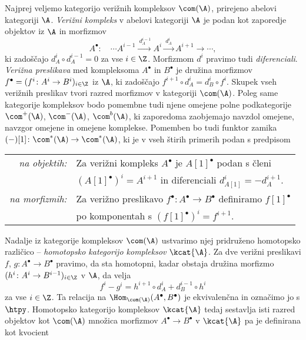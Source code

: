Najprej veljemo kategorijo verižnih kompleksov $\com(\A)$, prirejeno abelovi kategoriji $\A$. \emph{Verižni kompleks} v abelovi kategoriji $\A$ je podan kot zaporedje objektov iz $\A$ in morfizmov
\[
    A^\bullet : \quad \cdots A^{i-1} \xrightarrow{\ d_A^{i-1}} A^i \xrightarrow{\ d_A^{i} \ } A^{i+1} \to \cdots,
\] 
ki zadoščajo $d_A^{i} \circ d_A^{i-1} = 0$ za vse $i \in \Z$. Morfizmom $d^i$ pravimo tudi \emph{diferenciali}. \emph{Verižna preslikava} med kompleksoma $A^\bullet$ in $B^\bullet$ je družina morfizmov $f^\bullet = (f^i \colon A^i \to B^i)_{i \in \Z}$ iz $\A$, ki zadoščajo $f^{i+1} \circ d^i_A = d^i_B \circ f^i$. Skupek vseh verižnih preslikav tvori razred morfizmov v kategoriji $\com(\A)$. Poleg same kategorije kompleksov bodo pomembne tudi njene omejene polne podkategorije $\com^+(\A)$, $\com^-(\A)$, $\com^b(\A)$, ki zaporedoma zaobjemajo navzdol omejene, navzgor omejene in omejene komplekse. Pomemben bo tudi funktor zamika $(-)[1] \colon \com^*(\A) \to \com^*(\A)$, ki je v vseh štirih primerih podan s predpisom 
\begin{center}
    \begin{tabular}{r l}
        \textsl{na objektih:} & Za verižni kompleks $A^\bullet$ je $A[1]^\bullet$ podan s členi \\ & $(A[1]^\bullet)^i = A^{i+1}$ in diferenciali $d^i_{A[1]} = - d^{i+1}_{A}$. \\
        \textsl{na morfizmih:} & Za verižno preslikavo $f^\bullet\colon A^\bullet \to B^\bullet$ definiramo $f[1]^\bullet$ \\ & po komponentah s $(f[1]^\bullet)^i = f^{i+1}$.
    \end{tabular}
\end{center}
Nadalje iz kategorije kompleksov $\com(\A)$ ustvarimo njej pridruženo homotopsko različico -- \emph{homotopsko kategorijo kompleksov} $\kcat{\A}$. Za dve verižni preslikavi $f$, $g \colon A^\bullet \to B^\bullet$ pravimo, da sta homotopni, kadar obstaja družina morfizmo $(h^i \colon A^i \to B^{i-1})_{i \in\Z}$ v $\A$, da velja
\[
    f^i - g^i = h^{i+1} \circ d^i_A + d^{i-1}_B \circ h^i
\] 
za vse $i \in \Z$. Ta relacija na $\Hom_{\com(\A)}(A^\bullet, B^\bullet)$ je ekvivalenčna in označimo jo s $\htpy$. Homotopsko kategorijo kompleksov $\kcat{\A}$ tedaj sestavlja isti razred objektov kot $\com(\A)$ množica morfizmov $A^\bullet \to B^\bullet$ v $\kcat{\A}$ pa je definirana kot kvocient
